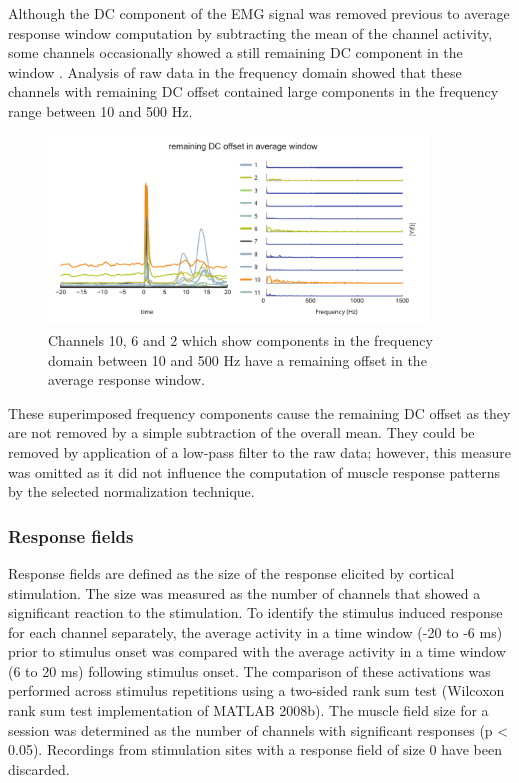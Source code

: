 Although the DC component of the EMG signal was removed previous to average response window computation by subtracting the mean of the channel activity, some channels occasionally showed a still remaining DC component in the  window . Analysis of raw data in the frequency domain showed that these channels with remaining DC offset contained large components in the frequency range between 10 and 500 Hz.
\begin{figure}[ht]
	\centering
		\includegraphics[width=0.9\textwidth]{images/dc_offset_fourier.pdf}
	\caption{Channels 10, 6 and 2 which show components in the frequency domain between 10 and 500 Hz have a remaining offset in the average response window.}
	\label{sg:fig:images_dc_offset_fourier}
\end{figure}
These superimposed frequency components cause the remaining DC offset as they are not removed by a simple subtraction of the overall mean. They could be removed by application of a low-pass filter to the raw data; however, this measure was omitted as it did not influence the computation of muscle response patterns by the selected normalization technique.



\subsubsection{Response fields} %
\label{sg:subs:response_fields}

Response fields are defined as the size of the response elicited by cortical stimulation. The size was measured as the number of channels that showed a significant reaction to the stimulation. To identify the stimulus induced response for each channel separately, the average activity in a time window (-20 to -6 ms) prior to stimulus onset was compared with the average activity in a time window (6 to 20 ms) following stimulus onset. The comparison of these activations was performed across stimulus repetitions using a two-sided rank sum test (Wilcoxon rank sum test implementation of MATLAB 2008b). The muscle field size for a session was determined as the number of channels with significant responses (p < 0.05). Recordings from stimulation sites with a response field of size 0 have been discarded.

